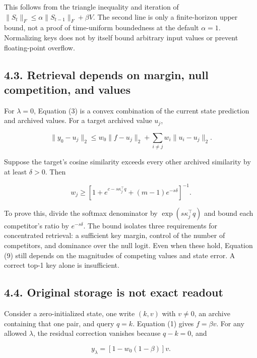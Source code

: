 \documentclass[11pt,a4paper]{article}
\begin{document}
This follows from the triangle inequality and iteration of \(\|S_t\|_F\leq\alpha\|S_{t-1}\|_F+\beta V\). The second line is only a finite-horizon upper bound, not a proof of time-uniform boundedness at the default \(\alpha=1\). Normalizing keys does not by itself bound arbitrary input values or prevent floating-point overflow.

\subsection{4.3. Retrieval depends on margin, null competition, and values}\label{retrieval-depends-on-margin-null-competition-and-values}

For \(\lambda=0\), Equation (3) is a convex combination of the current state prediction and archived values. For a target archived value \(u_j\),

\nopagebreak[4]

\[
\|y_0-u_j\|_2\leq w_0\|f-u_j\|_2+
\sum_{i\ne j}w_i\|u_i-u_j\|_2. \tag{9}
\]

Suppose the target's cosine similarity exceeds every other archived similarity by at least \(\delta>0\). Then

\nopagebreak[4]

\[
w_j\geq\left[1+e^{c-s\kappa_j^{\top}q}
 +(m-1)e^{-s\delta}\right]^{-1}. \tag{10}
\]

To prove this, divide the softmax denominator by \(\exp(s\kappa_j^{\top}q)\) and bound each competitor's ratio by \(e^{-s\delta}\). The bound isolates three requirements for concentrated retrieval: a sufficient key margin, control of the number of competitors, and dominance over the null logit. Even when these hold, Equation (9) still depends on the magnitudes of competing values and state error. A correct top-1 key alone is insufficient.

\subsection{4.4. Original storage is not exact readout}\label{original-storage-is-not-exact-readout}

Consider a zero-initialized state, one write \((k,v)\) with \(v\ne0\), an archive containing that one pair, and query \(q=k\). Equation (1) gives \(f=\beta v\). For any allowed \(\lambda\), the residual correction vanishes because \(q-k=0\), and

\nopagebreak[4]

\[
y_{\lambda}=[1-w_0(1-\beta)]v. \tag{11}
\]
\end{document}
